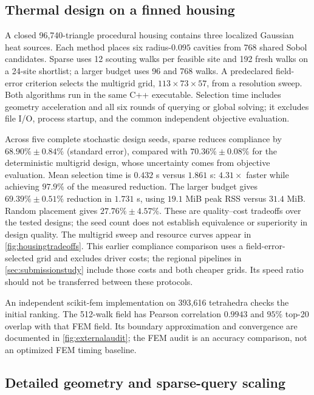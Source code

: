 



\subsection{Thermal design on a finned housing}

A closed 96,740-triangle procedural housing contains three localized Gaussian heat sources. Each method places six radius-$0.095$ cavities from 768 shared Sobol candidates. Sparse \method{} uses 12 scouting walks per feasible site and 192 fresh walks on a 24-site shortlist; a larger budget uses 96 and 768 walks. A predeclared field-error criterion selects the multigrid grid, $113\times73\times57$, from a resolution sweep. Both algorithms run in the same C++ executable. Selection time includes geometry acceleration and all six rounds of querying or global solving; it excludes file I/O, process startup, and the common independent objective evaluation.



Across five complete stochastic design seeds, sparse \method{} reduces compliance by $68.90\%\pm0.84\%$ (standard error), compared with $70.36\%\pm0.08\%$ for the deterministic multigrid design, whose uncertainty comes from objective evaluation. Mean selection time is $0.432$ s versus $1.861$ s: $4.31\times$ faster while achieving $97.9\%$ of the measured reduction. The larger \method{} budget gives $69.39\%\pm0.51\%$ reduction in $1.731$ s, using $19.1$ MiB peak RSS versus $31.4$ MiB. Random placement gives $27.76\%\pm4.57\%$. These are quality--cost tradeoffs over the tested designs; the seed count does not establish equivalence or superiority in design quality. The multigrid sweep and resource curves appear in \cref{fig:housingtradeoffs}. This earlier compliance comparison uses a field-error-selected grid and excludes driver costs; the regional pipelines in \cref{sec:submissionstudy} include those costs and both cheaper grids. Its speed ratio should not be transferred between these protocols.

An independent scikit-fem implementation on 393,616 tetrahedra checks the initial ranking. The 512-walk field has Pearson correlation $0.9943$ and $95\%$ top-20 overlap with that FEM field. Its boundary approximation and convergence are documented in \cref{fig:externalaudit}; the FEM audit is an accuracy comparison, not an optimized FEM timing baseline.

\subsection{Detailed geometry and sparse-query scaling}

